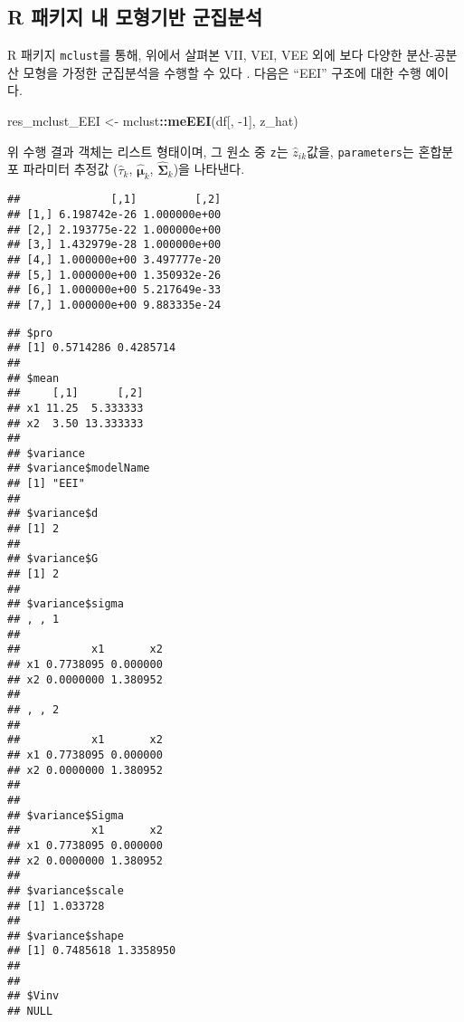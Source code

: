 \documentclass[]{book}
\newenvironment{Shaded}{\begin{snugshade}}{\end{snugshade}}
\newcommand{\DecValTok}[1]{\textcolor[rgb]{0.00,0.00,0.81}{#1}}
\newcommand{\KeywordTok}[1]{\textcolor[rgb]{0.13,0.29,0.53}{\textbf{#1}}}
\newcommand{\NormalTok}[1]{#1}
\newcommand{\OperatorTok}[1]{\textcolor[rgb]{0.81,0.36,0.00}{\textbf{#1}}}
\newcommand{\StringTok}[1]{\textcolor[rgb]{0.31,0.60,0.02}{#1}}
\begin{document}
\hypertarget{r-packages-model-based-clustering}{%
\subsection{R 패키지 내 모형기반 군집분석}\label{r-packages-model-based-clustering}}

R 패키지 \texttt{mclust}를 통해, 위에서 살펴본 VII, VEI, VEE 외에 보다 다양한 분산-공분산 모형을 가정한 군집분석을 수행할 수 있다 \citep{scrucca2016mclust}. 다음은 ``EEI'' 구조에 대한 수행 예이다.

\begin{Shaded}
\begin{Highlighting}[]
\NormalTok{res_mclust_EEI <-}\StringTok{ }\NormalTok{mclust}\OperatorTok{::}\KeywordTok{meEEI}\NormalTok{(df[, }\DecValTok{-1}\NormalTok{], z_hat)}
\end{Highlighting}
\end{Shaded}

위 수행 결과 객체는 리스트 형태이며, 그 원소 중 \texttt{z}는 \(\hat{z}_{ik}\)값을, \texttt{parameters}는 혼합분포 파라미터 추정값 (\(\hat{\tau}_k\), \(\hat{\boldsymbol\mu}_k\), \(\hat{\boldsymbol\Sigma}_k\))을 나타낸다.

\begin{Shaded}
\end{Shaded}

\begin{verbatim}
##              [,1]         [,2]
## [1,] 6.198742e-26 1.000000e+00
## [2,] 2.193775e-22 1.000000e+00
## [3,] 1.432979e-28 1.000000e+00
## [4,] 1.000000e+00 3.497777e-20
## [5,] 1.000000e+00 1.350932e-26
## [6,] 1.000000e+00 5.217649e-33
## [7,] 1.000000e+00 9.883335e-24
\end{verbatim}

\begin{Shaded}
\end{Shaded}

\begin{verbatim}
## $pro
## [1] 0.5714286 0.4285714
## 
## $mean
##     [,1]      [,2]
## x1 11.25  5.333333
## x2  3.50 13.333333
## 
## $variance
## $variance$modelName
## [1] "EEI"
## 
## $variance$d
## [1] 2
## 
## $variance$G
## [1] 2
## 
## $variance$sigma
## , , 1
## 
##           x1       x2
## x1 0.7738095 0.000000
## x2 0.0000000 1.380952
## 
## , , 2
## 
##           x1       x2
## x1 0.7738095 0.000000
## x2 0.0000000 1.380952
## 
## 
## $variance$Sigma
##           x1       x2
## x1 0.7738095 0.000000
## x2 0.0000000 1.380952
## 
## $variance$scale
## [1] 1.033728
## 
## $variance$shape
## [1] 0.7485618 1.3358950
## 
## 
## $Vinv
## NULL
\end{verbatim}
\end{document}
